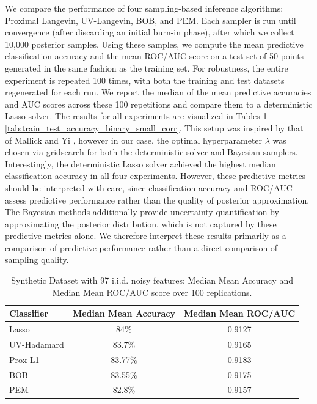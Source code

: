 \documentclass[11pt, twoside]{report}
\begin{document}
We compare the performance of four sampling-based inference algorithms: Proximal Langevin, UV-Langevin, BOB, and PEM. Each sampler is run until convergence (after discarding an initial burn-in phase), after which we collect 10,000 posterior samples. Using these samples, we compute the mean predictive classification accuracy and the mean ROC/AUC score on a test set of 50 points generated in the same fashion as the training set. For robustness, the entire experiment is repeated 100 times, with both the training and test datasets regenerated for each run. We report the median of the mean predictive accuracies and AUC scores across these 100 repetitions and compare them to a deterministic Lasso solver. The results for all experiments are visualized in Tables \ref{tab:train_test_accuracy_binary}-\ref{tab:train_test_accuracy_binary_small_corr}. This setup was inspired by that of Mallick and Yi \cite{mallick2014Bayesian}, however in our case, the optimal hyperparameter $\lambda$ was chosen via gridsearch for both the deterministic solver and Bayesian samplers. %
Interestingly, the deterministic Lasso solver achieved the highest median
classification accuracy in all four experiments. However, these predictive
metrics should be interpreted with care, since classification accuracy and
ROC/AUC assess predictive performance rather than the quality of posterior
approximation. The Bayesian methods additionally provide uncertainty
quantification by approximating the posterior distribution, which is not
captured by these predictive metrics alone. We therefore interpret these
results primarily as a comparison of predictive performance rather than a
direct comparison of sampling quality.
\begin{table}[h!]
    \centering
    \begin{tabular}{l c c}
        \hline
        \textbf{Classifier} & \textbf{Median Mean Accuracy} & \textbf{Median Mean ROC/AUC} \\
        \hline
        Lasso & 84\%  & 0.9127  \\
        UV-Hadamard & 83.7\%  & 0.9165  \\
        Prox-L1       & 83.77\%  & 0.9183  \\
        BOB                 & 83.55\%  & 0.9175  \\
        PEM      & 82.8\%  & 0.9157  \\
        \hline
    \end{tabular}
    \caption{Synthetic Dataset with 97 i.i.d. noisy features: Median Mean Accuracy and Median Mean ROC/AUC score over 100 replications.}
    \label{tab:train_test_accuracy_binary}
\end{table}
\end{document}
